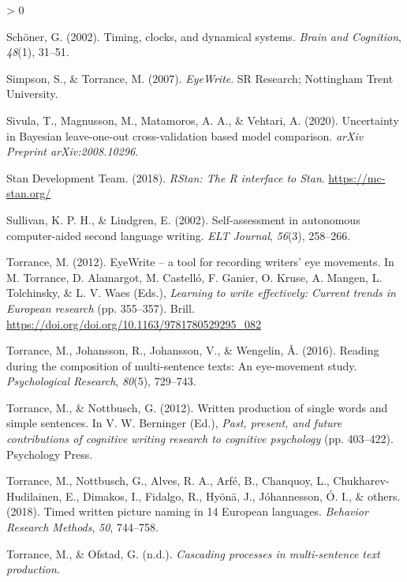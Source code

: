 \documentclass[
  english,
  man,floatsintext]{apa7}
\newlength{\cslhangindent}
\newenvironment{CSLReferences}[2] %
 {%
  \setlength{\parindent}{0pt}
  \ifodd #1 \everypar{\setlength{\hangindent}{\cslhangindent}}\ignorespaces\fi
  \ifnum #2 > 0
  \setlength{\parskip}{#2\baselineskip}
  \fi
 }%
 {}
\begin{document}
\begin{CSLReferences}{1}{0}
\leavevmode\hypertarget{ref-schoner2002timing}{}%
Schöner, G. (2002). Timing, clocks, and dynamical systems. \emph{Brain and Cognition}, \emph{48}(1), 31--51.

\leavevmode\hypertarget{ref-sim07}{}%
Simpson, S., \& Torrance, M. (2007). \emph{EyeWrite}. SR Research; Nottingham Trent University.

\leavevmode\hypertarget{ref-sivula2020uncertainty}{}%
Sivula, T., Magnusson, M., Matamoros, A. A., \& Vehtari, A. (2020). Uncertainty in {B}ayesian leave-one-out cross-validation based model comparison. \emph{arXiv Preprint arXiv:2008.10296}.

\leavevmode\hypertarget{ref-rstan}{}%
Stan Development Team. (2018). \emph{{RStan}: The {R} interface to {Stan}}. \url{https://mc-stan.org/}

\leavevmode\hypertarget{ref-sullivan2002self}{}%
Sullivan, K. P. H., \& Lindgren, E. (2002). Self-assessment in autonomous computer-aided second language writing. \emph{ELT Journal}, \emph{56}(3), 258--266.

\leavevmode\hypertarget{ref-torrance201203}{}%
Torrance, M. (2012). EyeWrite -- a tool for recording writers' eye movements. In M. Torrance, D. Alamargot, M. Castelló, F. Ganier, O. Kruse, A. Mangen, L. Tolchinsky, \& L. V. Waes (Eds.), \emph{Learning to write effectively: Current trends in {E}uropean research} (pp. 355--357). Brill. \url{https://doi.org/doi.org/10.1163/9781780529295_082}

\leavevmode\hypertarget{ref-torrance2016reading}{}%
Torrance, M., Johansson, R., Johansson, V., \& Wengelin, Å. (2016). Reading during the composition of multi-sentence texts: An eye-movement study. \emph{Psychological Research}, \emph{80}(5), 729--743.

\leavevmode\hypertarget{ref-torrance2012written}{}%
Torrance, M., \& Nottbusch, G. (2012). Written production of single words and simple sentences. In V. W. Berninger (Ed.), \emph{Past, present, and future contributions of cognitive writing research to cognitive psychology} (pp. 403--422). Psychology Press.

\leavevmode\hypertarget{ref-torrance2018timed}{}%
Torrance, M., Nottbusch, G., Alves, R. A., Arfé, B., Chanquoy, L., Chukharev-Hudilainen, E., Dimakos, I., Fidalgo, R., Hyönä, J., Jóhannesson, Ó. I., \& others. (2018). Timed written picture naming in 14 {E}uropean languages. \emph{Behavior Research Methods}, \emph{50}, 744--758.

\leavevmode\hypertarget{ref-torranceb}{}%
Torrance, M., \& Ofstad, G. (n.d.). \emph{Cascading processes in multi-sentence text production}.


\end{CSLReferences}
\end{document}
